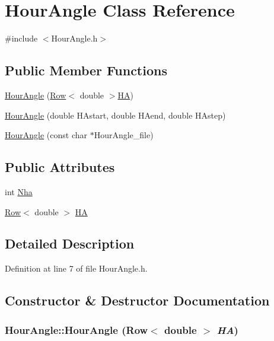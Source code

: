 \hypertarget{classHourAngle}{
\section{HourAngle Class Reference}
\label{classHourAngle}
}


{\ttfamily \#include $<$HourAngle.h$>$}

\subsection*{Public Member Functions}
\begin{DoxyCompactItemize}
\item 
\hyperlink{classHourAngle_aec8bcfaeed72734ca67aedbab698aa6a}{HourAngle} (\hyperlink{classRow}{Row}$<$ double $>$\hyperlink{classHourAngle_a2bbd1e4c34cf9c2f2294affb1abfff48}{HA})
\item 
\hyperlink{classHourAngle_a560a6d4f0dcba1f563b2acd5aaab022d}{HourAngle} (double HAstart, double HAend, double HAstep)
\item 
\hyperlink{classHourAngle_a86943a5f61aec13c2a98411163cd223a}{HourAngle} (const char $\ast$HourAngle\_\-file)
\end{DoxyCompactItemize}
\subsection*{Public Attributes}
\begin{DoxyCompactItemize}
\item 
int \hyperlink{classHourAngle_ac1d985530e4291043ac8be2b9e4c5d5f}{Nha}
\item 
\hyperlink{classRow}{Row}$<$ double $>$ \hyperlink{classHourAngle_a2bbd1e4c34cf9c2f2294affb1abfff48}{HA}
\end{DoxyCompactItemize}


\subsection{Detailed Description}


Definition at line 7 of file HourAngle.h.



\subsection{Constructor \& Destructor Documentation}
\hypertarget{classHourAngle_aec8bcfaeed72734ca67aedbab698aa6a}{
\subsubsection[{HourAngle}]{\setlength{\rightskip}{0pt plus 5cm}HourAngle::HourAngle ({\bf Row}$<$ double $>$ {\em HA})}}
\label{classHourAngle_aec8bcfaeed72734ca67aedbab698aa6a}


